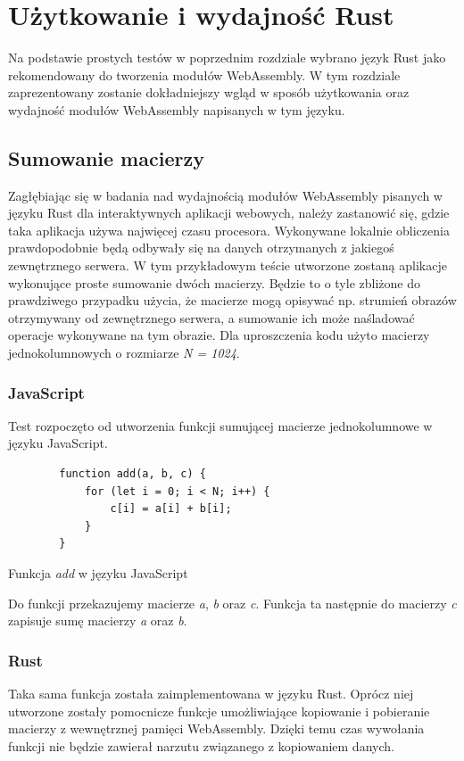 \documentclass[language=polish,type=master]{aghmodern}
\begin{document}
\chapter{Użytkowanie i wydajność Rust}
Na podstawie prostych testów w poprzednim rozdziale wybrano język Rust jako rekomendowany do tworzenia modułów WebAssembly.
W tym rozdziale zaprezentowany zostanie dokładniejszy wgląd w sposób użytkowania oraz wydajność modułów WebAssembly napisanych w tym języku.

\section{Sumowanie macierzy}
Zagłębiając się w badania nad wydajnością modułów WebAssembly pisanych w języku Rust dla interaktywnych aplikacji webowych, należy zastanowić się, gdzie taka aplikacja używa najwięcej czasu procesora.
Wykonywane lokalnie obliczenia prawdopodobnie będą odbywały się na danych otrzymanych z jakiegoś zewnętrznego serwera.
W tym przykładowym teście utworzone zostaną aplikacje wykonujące proste sumowanie dwóch macierzy.
Będzie to o tyle zbliżone do prawdziwego przypadku użycia, że macierze mogą opisywać np. strumień obrazów otrzymywany od zewnętrznego serwera, a sumowanie ich może naśladować operacje wykonywane na tym obrazie.
Dla uproszczenia kodu użyto macierzy jednokolumnowych o rozmiarze \emph{N = 1024}.

\subsection{JavaScript}
Test rozpoczęto od utworzenia funkcji sumującej macierze jednokolumnowe w języku JavaScript.

\begin{listing}[H]
    \begin{verbatim}
        function add(a, b, c) {
            for (let i = 0; i < N; i++) {
                c[i] = a[i] + b[i];
            }
        }
    \end{verbatim}
    \caption{Funkcja \emph{add} w języku JavaScript}
\end{listing}

Do funkcji przekazujemy macierze \emph{a}, \emph{b} oraz \emph{c}.
Funkcja ta następnie do macierzy \emph{c} zapisuje sumę macierzy \emph{a} oraz \emph{b}.

\subsection{Rust}
Taka sama funkcja została zaimplementowana w języku Rust.
Oprócz niej utworzone zostały pomocnicze funkcje umożliwiające kopiowanie i pobieranie macierzy z wewnętrznej pamięci WebAssembly.
Dzięki temu czas wywołania funkcji nie będzie zawierał narzutu związanego z kopiowaniem danych.
\end{document}
